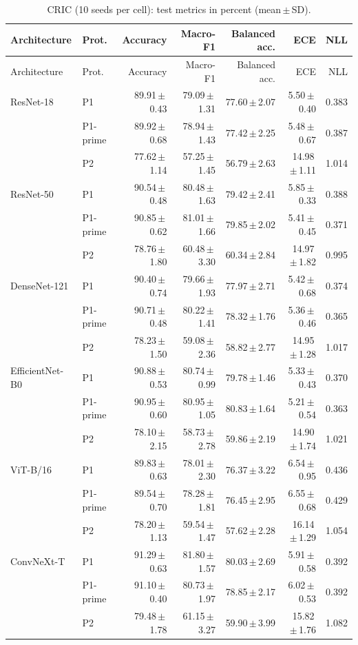 {\footnotesize
\setlength{\tabcolsep}{3.5pt}
\begin{longtable}{llrrrrr}
\caption{CRIC (10 seeds per cell): test metrics in percent (mean\,$\pm$\,SD).}\label{r:tab:cric}\\
\toprule
Architecture & Prot. & Accuracy & Macro-F1 & Balanced acc. & ECE & NLL \\
\midrule
\endfirsthead
\toprule
Architecture & Prot. & Accuracy & Macro-F1 & Balanced acc. & ECE & NLL \\
\midrule
\endhead
\bottomrule
\endfoot
ResNet-18 & P1 & 89.91\,$\pm$\,0.43 & 79.09\,$\pm$\,1.31 & 77.60\,$\pm$\,2.07 & 5.50\,$\pm$\,0.40 & 0.383 \\
 & P1-prime & 89.92\,$\pm$\,0.68 & 78.94\,$\pm$\,1.43 & 77.42\,$\pm$\,2.25 & 5.48\,$\pm$\,0.67 & 0.387 \\
 & P2 & 77.62\,$\pm$\,1.14 & 57.25\,$\pm$\,1.45 & 56.79\,$\pm$\,2.63 & 14.98\,$\pm$\,1.11 & 1.014 \\
ResNet-50 & P1 & 90.54\,$\pm$\,0.48 & 80.48\,$\pm$\,1.63 & 79.42\,$\pm$\,2.41 & 5.85\,$\pm$\,0.33 & 0.388 \\
 & P1-prime & 90.85\,$\pm$\,0.62 & 81.01\,$\pm$\,1.66 & 79.85\,$\pm$\,2.02 & 5.41\,$\pm$\,0.45 & 0.371 \\
 & P2 & 78.76\,$\pm$\,1.80 & 60.48\,$\pm$\,3.30 & 60.34\,$\pm$\,2.84 & 14.97\,$\pm$\,1.82 & 0.995 \\
DenseNet-121 & P1 & 90.40\,$\pm$\,0.74 & 79.66\,$\pm$\,1.93 & 77.97\,$\pm$\,2.71 & 5.42\,$\pm$\,0.68 & 0.374 \\
 & P1-prime & 90.71\,$\pm$\,0.48 & 80.22\,$\pm$\,1.41 & 78.32\,$\pm$\,1.76 & 5.36\,$\pm$\,0.46 & 0.365 \\
 & P2 & 78.23\,$\pm$\,1.50 & 59.08\,$\pm$\,2.36 & 58.82\,$\pm$\,2.77 & 14.95\,$\pm$\,1.28 & 1.017 \\
EfficientNet-B0 & P1 & 90.88\,$\pm$\,0.53 & 80.74\,$\pm$\,0.99 & 79.78\,$\pm$\,1.46 & 5.33\,$\pm$\,0.43 & 0.370 \\
 & P1-prime & 90.95\,$\pm$\,0.60 & 80.95\,$\pm$\,1.05 & 80.83\,$\pm$\,1.64 & 5.21\,$\pm$\,0.54 & 0.363 \\
 & P2 & 78.10\,$\pm$\,2.15 & 58.73\,$\pm$\,2.78 & 59.86\,$\pm$\,2.19 & 14.90\,$\pm$\,1.74 & 1.021 \\
ViT-B/16 & P1 & 89.83\,$\pm$\,0.63 & 78.01\,$\pm$\,2.30 & 76.37\,$\pm$\,3.22 & 6.54\,$\pm$\,0.95 & 0.436 \\
 & P1-prime & 89.54\,$\pm$\,0.70 & 78.28\,$\pm$\,1.81 & 76.45\,$\pm$\,2.95 & 6.55\,$\pm$\,0.68 & 0.429 \\
 & P2 & 78.20\,$\pm$\,1.13 & 59.54\,$\pm$\,1.47 & 57.62\,$\pm$\,2.28 & 16.14\,$\pm$\,1.29 & 1.054 \\
ConvNeXt-T & P1 & 91.29\,$\pm$\,0.63 & 81.80\,$\pm$\,1.57 & 80.03\,$\pm$\,2.69 & 5.91\,$\pm$\,0.58 & 0.392 \\
 & P1-prime & 91.10\,$\pm$\,0.40 & 80.73\,$\pm$\,1.97 & 78.85\,$\pm$\,2.17 & 6.02\,$\pm$\,0.53 & 0.392 \\
 & P2 & 79.48\,$\pm$\,1.78 & 61.15\,$\pm$\,3.27 & 59.90\,$\pm$\,3.99 & 15.82\,$\pm$\,1.76 & 1.082 \\
\end{longtable}
}
